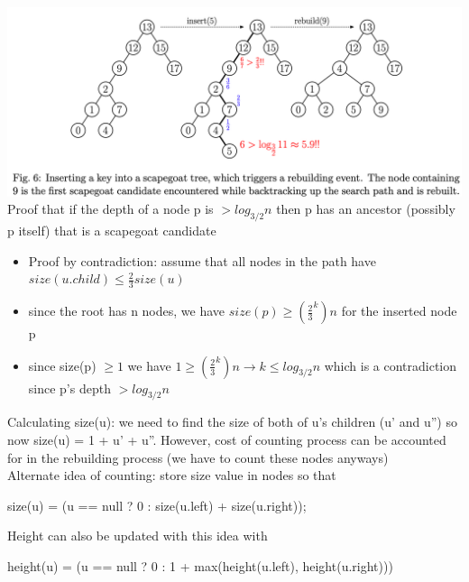 \documentclass{article}
\begin{document}
  \includegraphics[width=\textwidth]{ScapegoatInsertion}
  Proof that if the depth of a node p is $> log_{3/2}n$ then p has an ancestor (possibly p itself) that is a scapegoat candidate
  \begin{itemize}[noitemsep]
    \item Proof by contradiction: assume that all nodes in the path have $size(u.child) \leq \frac{2}{3} size(u)$
    \item since the root has n nodes, we have $size(p) \geq (\frac{2}{3}^{k})n$ for the inserted node p
    \item since size(p) $\geq 1$ we have $1 \geq (\frac{2}{3}^{k})n \rightarrow k \leq log_{3/2}n$ which is a contradiction since p's depth $ > log_{3/2}n$ \\ 
  \end{itemize}
  Calculating size(u): we need to find the size of both of u's children (u' and u'') so now size(u) = 1 + u' + u''. However, cost of counting process can be accounted for in the rebuilding process (we have to count these nodes anyways)\\
  Alternate idea of counting: store size value in nodes so that
  \begin{center}
    size(u) = (u == null ? 0 : size(u.left) + size(u.right));
  \end{center}
  Height can also be updated with this idea with
\begin{center}
  height(u) = (u == null ? 0 : 1 + max(height(u.left), height(u.right)))
  \end{center}
  \newpage
\end{document}

